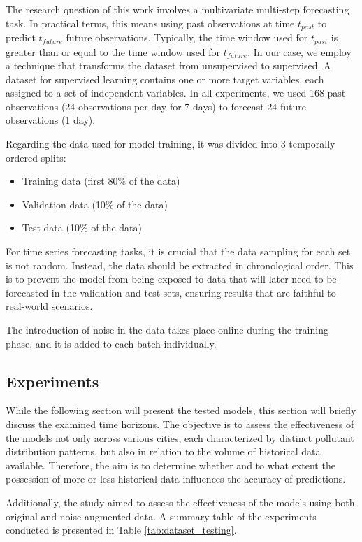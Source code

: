 The research question of this work involves a multivariate multi-step forecasting task. In practical terms, this means using past observations at time $t_{past}$ to predict $t_{future}$ future observations. Typically, the time window used for $t_{past}$ is greater than or equal to the time window used for $t_{future}$.
In our case, we employ a technique that transforms the dataset from unsupervised to supervised. A dataset for supervised learning contains one or more target variables, each assigned to a set of independent variables.
In all experiments, we used 168 past observations (24 observations per day for 7 days) to forecast 24 future observations (1 day).

Regarding the data used for model training, it was divided into 3 temporally ordered splits:
\begin{itemize}
    \item Training data (first 80\% of the data)
    \item Validation data (10\% of the data)
    \item Test data (10\% of the data)
\end{itemize}

For time series forecasting tasks, it is crucial that the data sampling for each set is not random. Instead, the data should be extracted in chronological order. This is to prevent the model from being exposed to data that will later need to be forecasted in the validation and test sets, ensuring results that are faithful to real-world scenarios.

The introduction of noise in the data takes place online during the training phase, and it is added to each batch individually.

\subsection{Experiments}
\label{subsec:experiments}
While the following section will present the tested models, this section will briefly discuss the examined time horizons. The objective is to assess the effectiveness of the models not only across various cities, each characterized by distinct pollutant distribution patterns, but also in relation to the volume of historical data available. Therefore, the aim is to determine whether and to what extent the possession of more or less historical data influences the accuracy of predictions.

Additionally, the study aimed to assess the effectiveness of the models using both original and noise-augmented data. A summary table of the experiments conducted is presented in Table \ref{tab:dataset_testing}.


